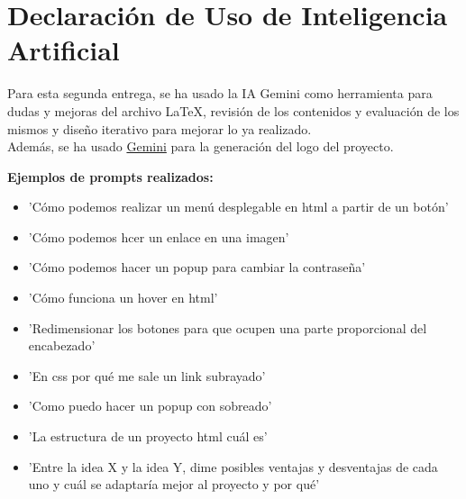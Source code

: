 \documentclass[10pt]{article}
\begin{document}
	
	\section{Declaración de Uso de Inteligencia Artificial}
	Para esta segunda entrega, se ha usado la IA Gemini como herramienta para dudas y mejoras del archivo LaTeX, revisión de los contenidos y evaluación de los mismos y diseño iterativo para mejorar lo ya realizado.\\
	Además, se ha usado \href{https://gemini.google.com/share/7a923a0bfae8}{Gemini} para la generación del logo del proyecto.
	
	\textbf{Ejemplos de prompts realizados:}
	\begin{itemize}
		\item 'Cómo podemos realizar un menú desplegable en html a partir de un botón'
		\item 'Cómo podemos hcer un enlace en una imagen'
		\item 'Cómo podemos hacer un popup para cambiar la contraseña'
		\item 'Cómo funciona un hover en html'
		\item 'Redimensionar los botones para que ocupen una parte proporcional del encabezado'
		\item 'En css por qué me sale un link subrayado'
		\item 'Como puedo hacer un popup con sobreado'
		\item 'La estructura de un proyecto html cuál es'
		\item 'Entre la idea X y la idea Y, dime posibles ventajas y desventajas de cada uno y cuál se adaptaría mejor al proyecto y por qué'
	\end{itemize}
	
	
\end{document}
